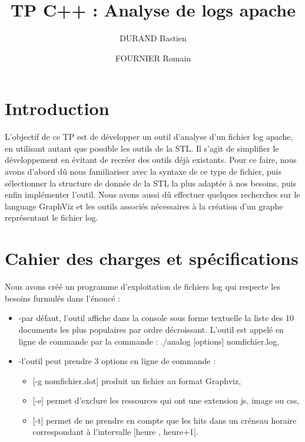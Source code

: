 \documentclass[a4paper]{article}
\title{TP C++ \no 4 : 
\bigbreak
Analyse de logs apache
}
\author{DURAND Bastien \and FOURNIER Romain}
\begin{document}
\maketitle
\thispagestyle{fancy}

\tableofcontents
\smallbreak
\vspace*{\fill}

\section*{Introduction}\noindent

	L'objectif de ce TP est de développer un outil d'analyse d'un fichier log apache, en utilisant autant que possible les outils de la STL. Il s'agit de simplifier le développement en évitant de recréer des outils déjà existants.
	Pour ce faire, nous avons d'abord dû nous familiariser avec la syntaxe de ce type de fichier, puis sélectionner la structure de donnée de la STL la plus adaptée à nos besoins, puis enfin implémenter l'outil.
	Nous avons aussi dû effectuer quelques recherches sur le language GraphViz et les outils associés nécessaires à la création d'un graphe représentant le fichier log.
\vspace*{\fill}

\clearpage

\section{Cahier des charges et spécifications}\noindent
	
	Nous avons créé un programme d'exploitation de fichiers log qui respecte les besoins furmulés dans l'énoncé :\\
	\begin{itemize}[label=\textbullet]
	\item -par défaut, l'outil affiche dans la console sous forme textuelle la liste des 10 documents les plus populaires par ordre décroissant. L'outil est 			appelé en ligne de commande par la commande : ./analog [options] nomfichier.log,
	\item -l'outil peut prendre 3 options en ligne de commande :\\
	\begin{itemize}
		\item{} [-g nomfichier.dot] produit un fichier au format Graphviz,
		\item{} [-e] permet d'exclure les ressources qui ont une extension js, image ou css,
		\item{} [-t] permet de ne prendre en compte que les hits dans un créneau horaire correspondant à l'intervalle [heure , heure+1].
	\end{itemize}
	\end{itemize}		
	
\end{document}
